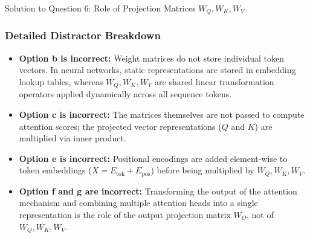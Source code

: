 \documentclass[11pt,a4paper]{article}
\begin{document}
\begin{solutionbox}{Solution to Question 6: Role of Projection Matrices $W_Q, W_K, W_V$}
\subsubsection*{Detailed Distractor Breakdown}
\begin{itemize}[leftmargin=1.5em]
    \item \textbf{Option b is incorrect:} Weight matrices do not store individual token vectors. In neural networks, static representations are stored in embedding lookup tables, whereas $W_Q, W_K, W_V$ are shared linear transformation operators applied dynamically across all sequence tokens.
    \item \textbf{Option c is incorrect:} The matrices themselves are not passed to compute attention scores; the projected vector representations ($Q$ and $K$) are multiplied via inner product.
    \item \textbf{Option e is incorrect:} Positional encodings are added element-wise to token embeddings ($X = E_{\text{tok}} + E_{\text{pos}}$) before being multiplied by $W_Q, W_K, W_V$.
    \item \textbf{Option f and g are incorrect:} Transforming the output of the attention mechanism and combining multiple attention heads into a single representation is the role of the output projection matrix $W_O$, not of $W_Q, W_K, W_V$.
\end{itemize}
\end{solutionbox}

\vspace{0.4cm}
\end{document}
